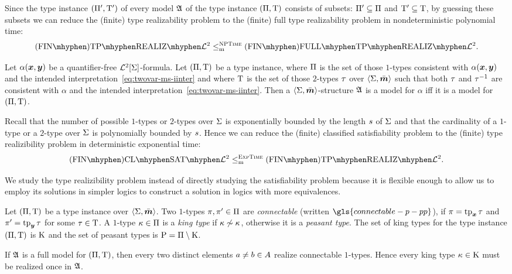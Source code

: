 \begin{remark}\label{rem:red-real-to-full-real}
Since the type instance $(\Pi',\mathrm{T}')$ of every model $\mathfrak{A}$ of the type
instance $(\Pi,\mathrm{T})$ consists of subsets: $\Pi' \subseteq \Pi$ and $\mathrm{T}'
\subseteq \mathrm{T}$, by guessing these subsets we can reduce the (finite) type
realizability problem to the (finite) full type realizability problem in
nondeterministic polynomial time:
\[
  \FinAReal{\vFo2} \red\cNP \FinAFullReal{\vFo2}.
\]
\end{remark}

\begin{remark}\label{rem:red-sat-to-real}
Let $\alpha(\bm{x},\bm{y})$ be a quantifier-free $\mathcal{L}^{2}[\mathrm{\Sigma}]$-formula.
Let $(\Pi,\mathrm{T})$ be a type instance, where $\Pi$ is the set of those
$1$-types consistent with $\alpha(\bm{x},\bm{y})$ and the intended
interpretation~\cref{eq:twovar-ms-iinter} and where $\mathrm{T}$ is the set of
those $2$-types $\tau$ over $\left\langle \mathrm{\Sigma},\bar{\bm{m}} \right\rangle$ such that both $\tau$ and 
$\tau^{-1}$ are consistent with $\alpha$ and the intended interpretation~\cref{eq:twovar-ms-iinter}. Then a $\left\langle \mathrm{\Sigma},\bar{\bm{m}} \right\rangle$-structure
$\mathfrak{A}$ is a model for $\alpha$ iff it is a model for $(\Pi,\mathrm{T})$.

Recall that the number of possible $1$-types or $2$-types over $\mathrm{\Sigma}$ is
exponentially bounded by the length $s$ of $\mathrm{\Sigma}$ and that the cardinality
of a $1$-type or a $2$-type over $\mathrm{\Sigma}$ is polynomially bounded by $s$.
Hence we can reduce the (finite) classified satisfiability problem to the
(finite) type realizibility problem in deterministic exponential time:
\[
  \FinAClSat{\vFo2} \red\cExpTime \FinAReal{\vFo2}.
\]
\end{remark}

We study the type realizibility problem instead of directly studying the
satisfiability problem because it is flexible enough to allow us to employ its
solutions in simpler logics to construct a solution in logics with more
equivalences.
\begin{definition}\label{def:connectable}
Let $(\Pi,\mathrm{T})$ be a type instance over $\left\langle \mathrm{\Sigma},\bar{\bm{m}} \right\rangle$.
Two $1$-types $\pi, {\pi'} \in \Pi$ are \emph{connectable} (written
$\gls{connectable-p-pp}$), if $\pi = \operatorname{tp}_{\bm{x}}\tau$ and ${\pi'} = \operatorname{tp}_{\bm{y}}\tau$ for some $\tau \in \mathrm{T}$. A $1$-type $\kappa \in \Pi$ is a \emph{king type} if
$\kappa \not\sim \kappa$, otherwise it is a \emph{peasant type}. The set of king
types for the type instance $(\Pi,\mathrm{T})$ is $\mathrm{K}$ and the set of peasant
types is $\mathrm{P} = \Pi \setminus \mathrm{K}$.
\end{definition}
\begin{remark}\label{rem:twovar-king-once}
If $\mathfrak{A}$ is a full model for $(\Pi,\mathrm{T})$, then every two distinct elements
$a \neq b \in A$ realize connectable $1$-types. Hence every king type
$\kappa \in \mathrm{K}$ must be realized once in $\mathfrak{A}$.
\end{remark}

